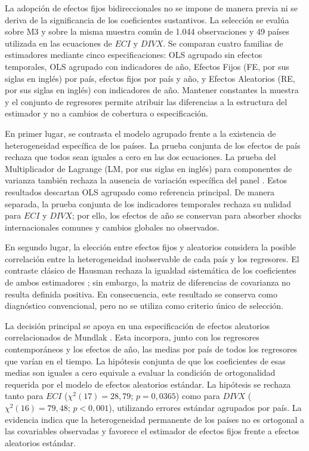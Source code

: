 \documentclass[../../TFM.tex]{subfiles}
\begin{document}
	La adopción de efectos fijos bidireccionales no se impone de manera previa ni
	se deriva de la significancia de los coeficientes sustantivos. La selección se
	evalúa sobre M3 y sobre la misma muestra común de 1.044 observaciones y 49
	países utilizada en las ecuaciones de $ECI$ y $DIVX$. Se comparan cuatro
	familias de estimadores mediante cinco especificaciones: OLS agrupado sin
	efectos temporales, OLS agrupado con indicadores
	de año, Efectos Fijos (FE, por sus siglas en inglés) por país, efectos fijos
	por país y año, y Efectos Aleatorios (RE, por sus siglas en inglés) con
	indicadores de año. Mantener constantes la muestra y el conjunto
	de regresores permite atribuir las diferencias a la estructura del estimador y
	no a cambios de cobertura o especificación.

	En primer lugar, se contrasta el modelo agrupado frente a la existencia de
	heterogeneidad específica de los países. La prueba conjunta de los efectos de
	país rechaza que todos sean iguales a cero en las dos ecuaciones. La prueba del
	Multiplicador de Lagrange (LM, por sus siglas en inglés) para componentes
	de varianza también rechaza la
	ausencia de variación específica del panel \parencite{BreuschPagan1980}. Estos
	resultados descartan OLS agrupado como referencia principal. De manera
	separada, la prueba conjunta de los indicadores temporales rechaza su nulidad
	para $ECI$ y $DIVX$; por ello, los efectos de año se conservan para absorber
	shocks internacionales comunes y cambios globales no observados.

	En segundo lugar, la elección entre efectos fijos y aleatorios considera la
	posible correlación entre la heterogeneidad inobservable de cada país y los
	regresores. El contraste clásico de Hausman rechaza la igualdad sistemática de
	los coeficientes de ambos estimadores \parencite{Hausman1978}; sin embargo, la
	matriz de diferencias de covarianza no resulta definida positiva. En
	consecuencia, este resultado se conserva como diagnóstico convencional, pero
	no se utiliza como criterio único de selección.

	La decisión principal se apoya en una especificación de efectos aleatorios
	correlacionados de Mundlak \parencite{Mundlak1978}. Esta incorpora, junto con
	los regresores contemporáneos y los efectos de año, las medias por país de
	todos los regresores que varían en el tiempo. La hipótesis conjunta de que los
	coeficientes de esas medias son iguales a cero equivale a evaluar la condición
	de ortogonalidad requerida por el modelo de efectos aleatorios estándar. La
	hipótesis se rechaza tanto para $ECI$
	($\chi^{2}(17)=28{,}79$; $p=0{,}0365$) como para $DIVX$
	($\chi^{2}(16)=79{,}48$; $p<0{,}001$), utilizando errores estándar agrupados
	por país. La evidencia indica que la heterogeneidad permanente de los países
	no es ortogonal a las covariables observadas y favorece el estimador de efectos
	fijos frente a efectos aleatorios estándar.
\end{document}
